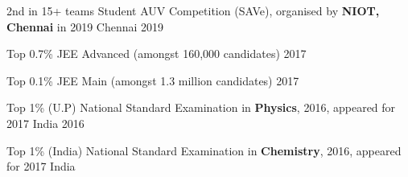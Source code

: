\begin{cvhonors}

  \cvhonor
    {2nd in 15+ teams}
    {Student AUV Competition (SAVe), \break organised by\textbf{ NIOT, Chennai} in 2019} 
    {Chennai} 
    {2019}
 
  \cvhonor
  {Top 0.7\%}
  {JEE Advanced (amongst 160,000 candidates)}
  {}
  {2017}

  \cvhonor
  {Top 0.1\%}
  {JEE Main (amongst 1.3 million candidates)}
  {}
  {2017}
  
  \cvhonor
  {Top 1\% (U.P)}
  {National Standard Examination in \textbf{Physics}, 2016, appeared for  2017}
  {India}
  {2016}
 
  \cvhonor
  {Top 1\% (India)} 
  {National Standard Examination in \textbf{Chemistry}, 2016, appeared for  2017}
  {India}
  {}

\end{cvhonors}

